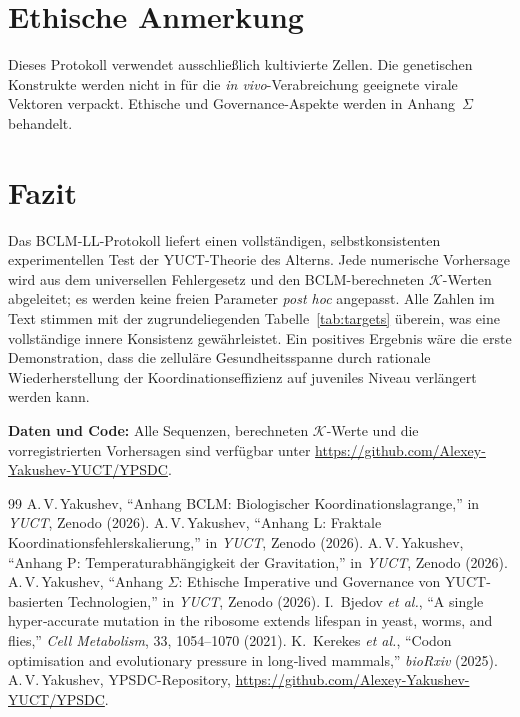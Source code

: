 \documentclass[12pt,a4paper]{article}
\newcommand{\REL}{\mathcal{K}}          %
\begin{document}
	\section{Ethische Anmerkung}
	\label{sec:ethics}
	Dieses Protokoll verwendet ausschließlich kultivierte Zellen. Die genetischen Konstrukte werden nicht in für die \textit{in vivo}-Verabreichung geeignete virale Vektoren verpackt. Ethische und Governance-Aspekte werden in Anhang~\(\Sigma\) behandelt.
	
	\section{Fazit}
	Das BCLM‑LL-Protokoll liefert einen vollständigen, selbstkonsistenten experimentellen Test der YUCT-Theorie des Alterns. Jede numerische Vorhersage wird aus dem universellen Fehlergesetz und den BCLM-berechneten \(\REL\)-Werten abgeleitet; es werden keine freien Parameter \emph{post hoc} angepasst. Alle Zahlen im Text stimmen mit der zugrundeliegenden Tabelle~\ref{tab:targets} überein, was eine vollständige innere Konsistenz gewährleistet. Ein positives Ergebnis wäre die erste Demonstration, dass die zelluläre Gesundheitsspanne durch rationale Wiederherstellung der Koordinationseffizienz auf juveniles Niveau verlängert werden kann.
	
	\vspace{0.5cm}
	\noindent\textbf{Daten und Code:} Alle Sequenzen, berechneten \(\REL\)-Werte und die vorregistrierten Vorhersagen sind verfügbar unter \url{https://github.com/Alexey-Yakushev-YUCT/YPSDC}.
	
	\begin{thebibliography}{99}
		 A.\,V.\,Yakushev, ``Anhang BCLM: Biologischer Koordinationslagrange,'' in \emph{YUCT}, Zenodo (2026).
		 A.\,V.\,Yakushev, ``Anhang L: Fraktale Koordinationsfehlerskalierung,'' in \emph{YUCT}, Zenodo (2026).
		 A.\,V.\,Yakushev, ``Anhang P: Temperaturabhängigkeit der Gravitation,'' in \emph{YUCT}, Zenodo (2026).
		 A.\,V.\,Yakushev, ``Anhang \(\Sigma\): Ethische Imperative und Governance von YUCT-basierten Technologien,'' in \emph{YUCT}, Zenodo (2026).
		 I.~Bjedov \emph{et al.}, ``A single hyper‑accurate mutation in the ribosome extends lifespan in yeast, worms, and flies,'' \emph{Cell Metabolism}, 33, 1054–1070 (2021).
		 K.~Kerekes \emph{et al.}, ``Codon optimisation and evolutionary pressure in long‑lived mammals,'' \emph{bioRxiv} (2025).
		 A.\,V.\,Yakushev, YPSDC-Repository, \url{https://github.com/Alexey-Yakushev-YUCT/YPSDC}.
	\end{thebibliography}
	
\end{document}
